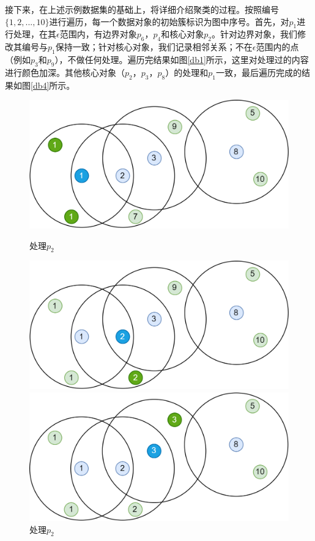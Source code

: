 \documentclass[12pt, a4paper, oneside]{ctexart}
\begin{document}
接下来，在上述示例数据集的基础上，将详细介绍聚类的过程。按照编号$ \{1,2,...,10\} $进行遍历，每一个数据对象的初始簇标识为图中序号。首先，对$ p_1 $进行处理，在其$ \epsilon $范围内，有边界对象$ p_6$，$p_4 $和核心对象$ p_2 $。针对边界对象，我们修改其编号与$ p_1 $保持一致；针对核心对象，我们记录相邻关系；不在$ \epsilon $范围内的点（例如$ p_3 $和$ p_9 $），不做任何处理。遍历完结果如图\ref{db1}所示，这里对处理过的内容进行颜色加深。其他核心对象（$ p_2 $，$ p_3 $，$ p_8 $）的处理和$ p_1 $一致，最后遍历完成的结果如图\ref{db4}所示。

\begin{figure}[htbp]
	\begin{minipage}[t]{0.24\linewidth}
		\centering
		\includegraphics[width=\linewidth]{../img/db2.png}
		\caption{处理$ p_2 $}
		\label{db2}
	\end{minipage}
\hfill
	\begin{minipage}[t]{0.24\linewidth}
		\centering
		\includegraphics[width=\linewidth]{../img/db3.png}
		\caption{处理$ p_2 $}
		\label{db2}
	\end{minipage}
\hfill
	\begin{minipage}[t]{0.24\linewidth}
	\centering
	\includegraphics[width=\linewidth]{../img/db4.png}

\end{minipage}
\end{figure}
\end{document}
